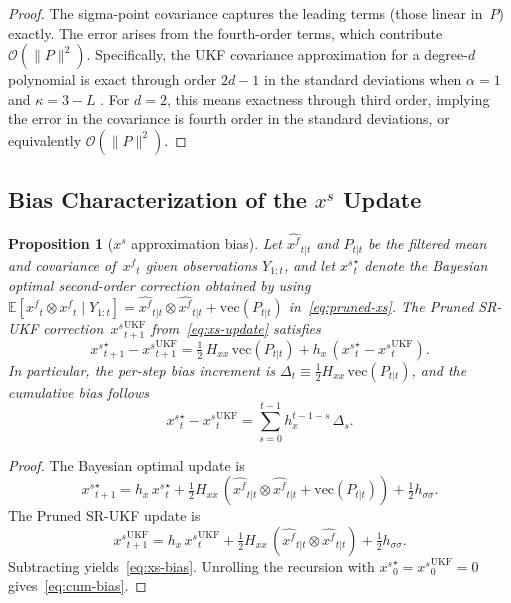 \documentclass[12pt,a4paper]{article}
\newtheorem{proposition}[theorem]{Proposition}
\newcommand{\E}{\mathbb{E}}
\newcommand{\vect}{\mathrm{vec}}
\newcommand{\kron}{\otimes}
\newcommand{\xf}{{x^{f}}}
\newcommand{\xs}{{x^{s}}}
\newcommand{\hx}{h_x}
\newcommand{\Hxx}{H_{xx}}
\newcommand{\hsig}{{h_{\sigma\sigma}}}
\newcommand{\cO}{\mathcal{O}}
\begin{document}
\begin{proof}
The sigma-point covariance captures the leading terms
(those linear in~$P$) exactly. The error arises from the fourth-order
terms, which contribute $\cO(\|P\|^2)$. Specifically, the UKF
covariance approximation for a degree-$d$ polynomial is exact through
order $2d - 1$ in the standard deviations when $\alpha = 1$ and
$\kappa = 3 - L$ \citep{julier2004unscented}. For $d = 2$, this
means exactness through third order, implying the error in the
covariance is fourth order in the standard deviations, or equivalently
$\cO(\|P\|^2)$.
\end{proof}

\subsection{Bias Characterization of the $\xs$ Update}\label{sec:bias}

\begin{proposition}[$\xs$ approximation bias]\label{prop:bias}
Let $\hat{\xf}_{t|t}$ and $P_{t|t}$ be the filtered mean and
covariance of~$\xf_t$ given observations $Y_{1:t}$, and let
$\xs_t^{\star}$ denote the Bayesian optimal second-order correction
obtained by using
$\E[\xf_t \kron \xf_t \mid Y_{1:t}]
= \hat{\xf}_{t|t} \kron \hat{\xf}_{t|t} + \vect(P_{t|t})$
in~\eqref{eq:pruned-xs}. The Pruned SR-UKF
correction~$\xs_{t+1}^{\mathrm{UKF}}$
from~\eqref{eq:xs-update} satisfies
\begin{equation}\label{eq:xs-bias}
\xs_{t+1}^{\star} - \xs_{t+1}^{\mathrm{UKF}}
= \tfrac{1}{2}\,\Hxx\,\vect(P_{t|t})
+ \hx\,(\xs_t^{\star} - \xs_t^{\mathrm{UKF}}).
\end{equation}
In particular, the per-step bias increment is
$\Delta_t \equiv \tfrac{1}{2}\Hxx\,\vect(P_{t|t})$, and the
cumulative bias follows
\begin{equation}\label{eq:cum-bias}
\xs_t^{\star} - \xs_t^{\mathrm{UKF}}
= \sum_{s=0}^{t-1} \hx^{t-1-s}\,\Delta_s.
\end{equation}
\end{proposition}

\begin{proof}
The Bayesian optimal update is
\begin{equation}
\xs_{t+1}^{\star} = \hx\,\xs_t^{\star}
  + \tfrac{1}{2}\Hxx\,
    (\hat{\xf}_{t|t} \kron \hat{\xf}_{t|t} + \vect(P_{t|t}))
  + \tfrac{1}{2}\hsig.
\end{equation}
The Pruned SR-UKF update is
\begin{equation}
\xs_{t+1}^{\mathrm{UKF}} = \hx\,\xs_t^{\mathrm{UKF}}
  + \tfrac{1}{2}\Hxx\,
    (\hat{\xf}_{t|t} \kron \hat{\xf}_{t|t})
  + \tfrac{1}{2}\hsig.
\end{equation}
Subtracting yields~\eqref{eq:xs-bias}. Unrolling the recursion with
$\xs_0^{\star} = \xs_0^{\mathrm{UKF}} = 0$
gives~\eqref{eq:cum-bias}.
\end{proof}
\end{document}
